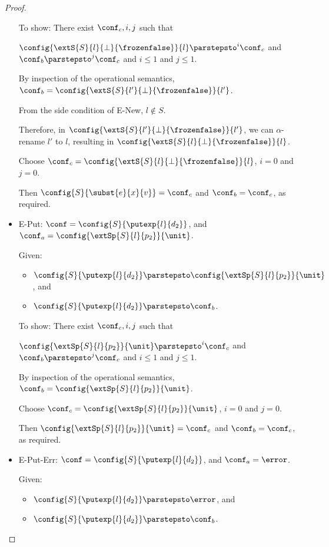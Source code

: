 \begin{proof}
\begin{itemize}
      To show: There exist $\conf_c, i, j$ such that

      $\config{\extS{S}{l}{\bot}{\frozenfalse}}{l} \parstepsto^i
      \conf_c$ and $\conf_b \parstepsto^j \conf_c$ and $i \leq 1$ and
      $j \leq 1$.

      By inspection of the operational semantics, $\conf_b =
      \config{\extS{S}{l'}{\bot}{\frozenfalse}}{l'}$.

      From the side condition of {\sc E-New}, $l \notin S$.

      Therefore, in $\config{\extS{S}{l'}{\bot}{\frozenfalse}}{l'}$,
      we can $\alpha$-rename $l'$ to $l$, resulting in
      $\config{\extS{S}{l}{\bot}{\frozenfalse}}{l}$.

      Choose $\conf_c = \config{\extS{S}{l}{\bot}{\frozenfalse}}{l}$,
      $i = 0$ and $j = 0$.

      Then $\config{S}{\subst{e}{x}{v}} = \conf_c$ and $\conf_b =
      \conf_c$, as required.

    \item {\sc E-Put}: $\conf = \config{S}{\putexp{l}{d_2}}$, and
      $\conf_a = \config{\extSp{S}{l}{p_2}}{\unit}$.

      Given:
      \begin{itemize}
      \item $\config{S}{\putexp{l}{d_2}} \parstepsto \config{\extSp{S}{l}{p_2}}{\unit}$, and
      \item $\config{S}{\putexp{l}{d_2}} \parstepsto \conf_b$.
      \end{itemize}

      To show: There exist $\conf_c, i, j$ such that

      $\config{\extSp{S}{l}{p_2}}{\unit} \parstepsto^i \conf_c$ and
      $\conf_b \parstepsto^j \conf_c$ and $i \leq 1$ and $j \leq 1$.

      By inspection of the operational semantics, $\conf_b =
      \config{\extSp{S}{l}{p_2}}{\unit}$.

      Choose $\conf_c = \config{\extSp{S}{l}{p_2}}{\unit}$, $i = 0$ and $j =
      0$.

      Then $\config{\extSp{S}{l}{p_2}}{\unit} = \conf_c$ and $\conf_b
      = \conf_c$, as required.

    \item {\sc E-Put-Err}: $\conf = \config{S}{\putexp{l}{d_2}}$, and
      $\conf_a = \error$.

      Given:
      \begin{itemize}
      \item $\config{S}{\putexp{l}{d_2}} \parstepsto \error$, and
      \item $\config{S}{\putexp{l}{d_2}} \parstepsto \conf_b$.
      \end{itemize}


\end{itemize}
\end{proof}
